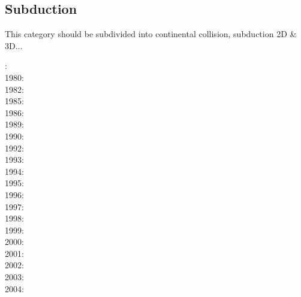 {\scriptsize
\noindent
\cite{bocs03}
\cite{wahh12}
\cite{vagd13a,vagd13b}\cite{milp13}\cite{myhi13}
\cite{vamd14}
\cite{hevg15}
\cite{gofv18}\cite{hefg18}\cite{hegv18}
}

\subsection{Subduction} 
This category should be subdivided into continental collision, subduction 2D \& 3D...

{\scriptsize
{}: \cite{haoc78}\\
1980: \cite{mera80}\\
1982: \cite{crpi82}\\
1985: \cite{thar85}\\
1986: \cite{jarr86}\cite{mipb96}\\
1989: \cite{boww89}\cite{mibj89}\\
1990: \cite{hstt90}\cite{kiha90}\\
1992: \cite{zhgu92}\cite{whbw92}\cite{gurn92}\\
1993: \cite{jope93}\cite{dvnm93}\cite{wibf93}\cite{shem93}\\
1994: \cite{zhgu94}\cite{wibe94}\cite{wdbo94a}\cite{wdbo94b}\cite{bequ94}\cite{gaha94}\\
1995: \cite{masa95}\\
1996: \cite{chri96}\cite{gisb96}\cite{wabe96}\cite{zhgu96}\\
1997: \cite{hajc97}\cite{kisa97}\cite{olwh97}\cite{nesg97}\\
1998: \cite{itki98}\cite{buwg98}\cite{brmy98}\cite{jabf98}\cite{wabb98}\\
1999: \cite{hagu99}\cite{befo99}\cite{bumo99}\cite{roda99}\cite{elbp99}\cite{scmr99}\cite{elbe99}
      \cite{beep99}\cite{nesb99}\\
2000: \cite{tesc00}\cite{brky00}\cite{bemh00}\cite{chlb00}\\
2001: \cite{bujl01}\cite{bugw01}\cite{chys01}\cite{coha01}\\
2002: \cite{civv02}\cite{clbb02}\cite{gesp02}\cite{ster02}\cite{jabn02}\\
2003: \cite{refm03}\cite{fumr03}\cite{gehd03}\cite{bigs03}\\
2004: \cite{toba04}\cite{bocj04}\cite{bejn04}\cite{tobj04}\cite{sche04}\cite{sche04b}\cite{enwi04}
      \cite{geys04}\\
}
